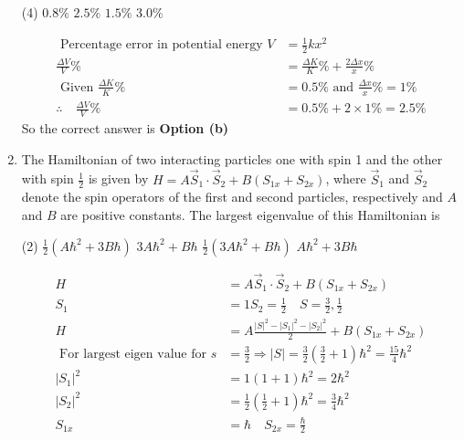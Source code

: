 \begin{enumerate}
 \begin{tasks}(4)
	\task[\textbf{a.}]$0.8 \%$
	\task[\textbf{b.}] $2.5 \%$
	\task[\textbf{c.}] $1.5 \%$
	\task[\textbf{d.}] $3.0 \%$ 
\end{tasks}
\begin{answer}
	\begin{align*}
	\text { Percentage error in potential energy } V&=\frac{1}{2} k x^{2}\\
	\frac{\Delta V}{V} \%&=\frac{\Delta K}{K} \%+\frac{2 \Delta x}{x} \%\\
\text{	Given }\frac{\Delta K}{K} \%&=0.5 \%\text{ and }\frac{\Delta x}{x} \%=1 \%\\
	\therefore \quad \frac{\Delta V}{V} \%&=0.5 \%+2 \times 1 \%=2.5 \%
	\end{align*}
		So the correct answer is \textbf{Option (b)}
\end{answer}
\item The Hamiltonian of two interacting particles one with spin 1 and the other with spin $\frac{1}{2}$ is given by $H=A \vec{S}_{1} \cdot \vec{S}_{2}+B\left(S_{1 x}+S_{2 x}\right)$, where $\vec{S}_{1}$ and $\vec{S}_{2}$ denote the spin operators of the first and second particles, respectively and $A$ and $B$ are positive constants. The largest eigenvalue of this Hamiltonian is
 \begin{tasks}(2)
	\task[\textbf{a.}] $\frac{1}{2}\left(A \hbar^{2}+3 B \hbar\right)$
	\task[\textbf{b.}]$3 A \hbar^{2}+B \hbar$
	\task[\textbf{c.}] $\frac{1}{2}\left(3 A \hbar^{2}+B \hbar\right)$
	\task[\textbf{d.}]  $A \hbar^{2}+3 B \hbar$	
\end{tasks}
\begin{answer}
	\begin{align*}
	H&=A \vec{S}_{1} \cdot \vec{S}_{2}+B\left(S_{1 x}+S_{2 x}\right)\\
	S_{1}&=1 S_{2}=\frac{1}{2} \quad S=\frac{3}{2}, \frac{1}{2} \\
	H&=A \frac{|S|^{2}-\left|S_{1}\right|^{2}-\left|S_{2}\right|^{2}}{2}+B\left(S_{1 x}+S_{2 x}\right)\\
	\text { For largest eigen value for } s&=\frac{3}{2} \Rightarrow|S|=\frac{3}{2}\left(\frac{3}{2}+1\right) \hbar^{2}=\frac{15}{4} \hbar^{2}\\
	\left|S_{1}\right|^{2}&=1(1+1) \hbar^{2}=2 \hbar^{2} \\
	\left|S_{2}\right|^{2}&=\frac{1}{2}\left(\frac{1}{2}+1\right) \hbar^{2}=\frac{3}{4} \hbar^{2}\\
	S_{1 x}&=\hbar \quad S_{2 x}=\frac{\hbar}{2}\\

\end{align*}
\end{answer}
\end{enumerate}

